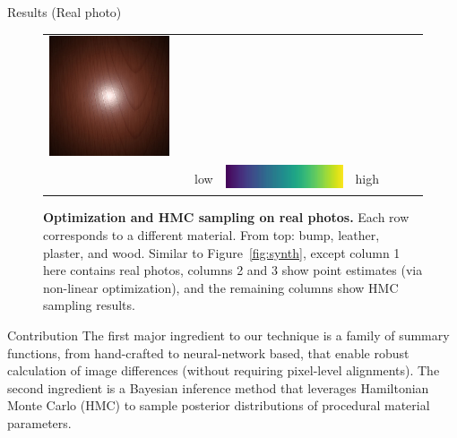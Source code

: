 \documentclass[final]{beamer}
\newlength{\twocolwid}
\newlength{\resultwidth}
\begin{document}
\begin{frame}[t]
\begin{columns}[t]
\begin{column}{\twocolwid}
\begin{block}{Results (Real photo)}
\begin{figure}[t]
\begin{tabular}{ccrclccc}
            		\includegraphics[width=\resultwidth]{real/wood/bad1.jpg}
            		\\
            		& & low &
            		\includegraphics[width=\resultwidth]{other/colorbar.jpg} &
            		high & & &
            	\end{tabular}
            	\caption{\label{fig:real}
            		\textbf{Optimization and HMC sampling on real photos.}
            		Each row corresponds to a different material. From top: bump, leather, plaster, and wood. Similar to Figure~\protect\ref{fig:synth}, except column 1 here contains real photos, columns 2 and 3 show point estimates (via non-linear optimization), and the remaining columns show HMC sampling results.
            	}
            \end{figure}
        \end{block}

        \begin{block}{Contribution}
            \large{
                The first major ingredient to our technique is a family of summary functions, from hand-crafted to neural-network based, that enable robust calculation of image differences (without requiring pixel-level alignments). The second ingredient is a Bayesian inference method that leverages Hamiltonian Monte Carlo (HMC) to sample posterior distributions of procedural material parameters.
            }
        \end{block}


\end{column}
\end{columns}
\end{frame}
\end{document}
